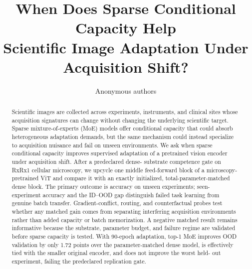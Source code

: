 \documentclass{article}
\title{When Does Sparse Conditional Capacity Help\\Scientific Image Adaptation Under Acquisition Shift?}
\author{Anonymous authors}
\begin{document}
\maketitle
\begin{abstract}
Scientific images are collected across experiments, instruments, and clinical sites whose
acquisition signatures can change without changing the underlying scientific target. Sparse
mixture-of-experts (MoE) models offer conditional capacity that could absorb heterogeneous
adaptation demands, but the same mechanism could instead specialize to acquisition nuisance and
fail on unseen environments. We ask when sparse conditional capacity improves supervised
adaptation of a pretrained vision encoder under acquisition shift. After a predeclared dense-
substrate competence gate on RxRx1 cellular microscopy, we upcycle one middle feed-forward block
of a microscopy-pretrained ViT and compare it with an exactly initialized,
total-parameter-matched dense block. The primary outcome is accuracy on unseen experiments; seen-
experiment accuracy and the ID--OOD gap distinguish failed task learning from genuine batch
transfer. Gradient-conflict, routing, and counterfactual probes test whether any matched gain comes
from separating interfering acquisition environments rather than added capacity or batch
memorization. A negative matched result remains informative because the substrate, parameter
budget, and failure regime are validated before sparse capacity is tested. With 90-epoch
adaptation, top-1 MoE improves OOD validation by only 1.72 points over the parameter-matched dense
model, is effectively tied with the smaller original encoder, and does not improve the worst held-
out experiment, failing the predeclared replication gate.
\end{abstract}









\appendix

\end{document}
